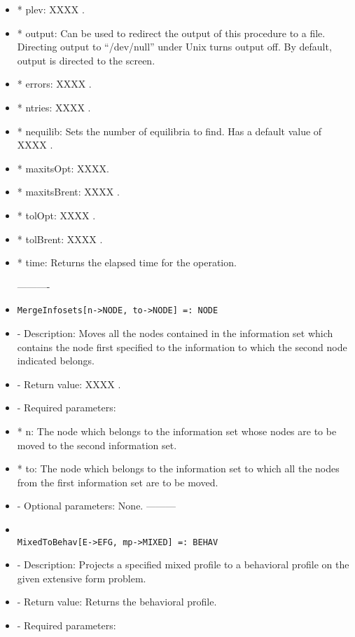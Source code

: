 \begin{itemize}
\bd
\item
*  plev: XXXX .
\item
*  output:  Can be used to redirect the output of this procedure to a
file.  Directing output to ``/dev/null'' under Unix turns output off.
By default, output is directed to the screen.
\item
*  errors:  XXXX .
\item
*  ntries:  XXXX .
\item
*  nequilib:  Sets the number of equilibria to find.  Has a default 
value of XXXX . 
\item
*  maxitsOpt:  XXXX.
\item
*  maxitsBrent:  XXXX .
\item
*  tolOpt:  XXXX . 
\item
*  tolBrent:  XXXX .
\item
*  time:  Returns the elapsed time for the operation.
\ed
\ed

----------
\item
\begin{verbatim}
MergeInfosets[n->NODE, to->NODE] =: NODE
\end{verbatim}

\bd
\item
- Description:  Moves all the nodes contained in the information set 
which contains the node first specified to the information to which the
second node indicated belongs.
\item
- Return value:  XXXX .
\item
- Required parameters:

\bd
\item
*  n:  The node which belongs to the information set whose nodes are
to be moved to the second information set.
\item
*  to:  The node which belongs to the information set to which all
the nodes from the first information set are to be moved.
\ed

\item
- Optional parameters:  None.
\ed
---------

\item
\begin{verbatim}

MixedToBehav[E->EFG, mp->MIXED] =: BEHAV
\end{verbatim}

\bd
\item
- Description:  Projects a specified mixed profile to a behavioral 
profile on the given extensive form problem.
\item
- Return value:  Returns the behavioral profile.
\item
- Required parameters:


\end{itemize}

